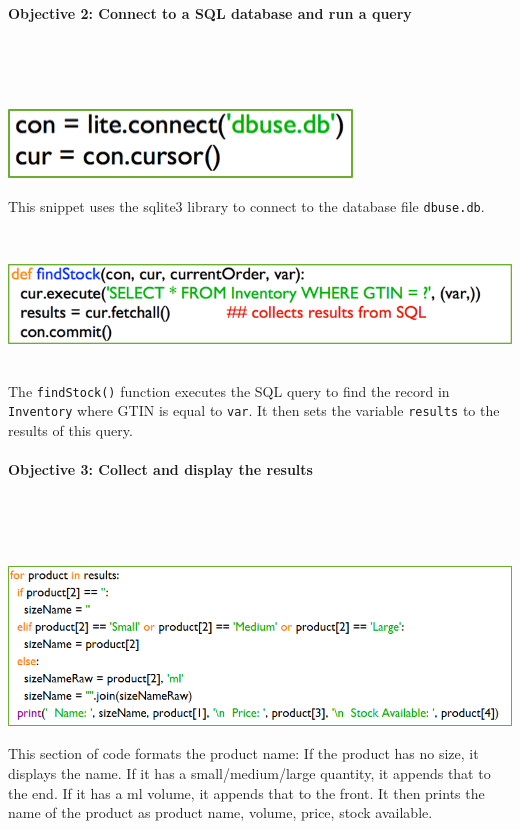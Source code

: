 \documentclass[a4paper]{article}
\begin{document}
\paragraph{Objective 2: Connect to a SQL database and run a query} ~\par ~\par
\noindent\includegraphics{task2_obj2_1.png} ~\par
This snippet uses the sqlite3 library to connect to the database file \verb?dbuse.db?. ~\par ~\par
\noindent\includegraphics{task2_obj2_2.png} ~\par
The \verb|findStock()| function executes the SQL query to find the record in \verb?Inventory? where GTIN is equal to \verb?var?. It then sets the variable \verb?results? to the results of this query. ~\par
\paragraph{Objective 3: Collect and display the results} ~\par ~\par
\noindent\includegraphics{task2_obj3_1.png} \par
This section of code formats the product name: If the product has no size, it displays the name. If it has a small/medium/large quantity, it appends that to the end. If it has a ml volume, it appends that to the front. It then prints the name of the product as product name, volume, price, stock available.
\newpage
\end{document}
